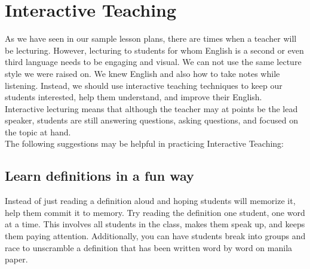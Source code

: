 \chapter{Interactive Teaching}
As we have seen in our sample lesson plans, there are times when a teacher will be lecturing.  However, lecturing to students for whom English is a second or even third language needs to be engaging and visual.  We can not use the same lecture style we were raised on. We knew English and also how to take notes while listening. Instead, we should use interactive teaching techniques to keep our students interested, help them  understand, and improve their English. \\

Interactive lecturing means that although the teacher may at points be the lead speaker, students are still answering questions, asking questions, and focused on the topic at hand.\\

The following suggestions may be helpful in practicing Interactive Teaching:

\section{Learn definitions in a fun way}
Instead of just reading a definition aloud and hoping students will memorize it, help them commit it to memory.  Try reading the definition one student, one word at a time.  This involves all students in the class, makes them speak up, and keeps them paying attention.  Additionally, you can have students break into groups and race to unscramble a definition that has been written word by word on manila paper.\\

